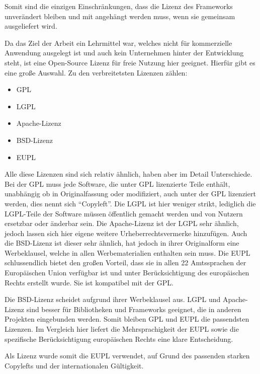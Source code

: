 Somit sind die einzigen Einschränkungen, dass die Lizenz des Frameworks unverändert bleiben und mit angehängt werden muss, wenn sie gemeinsam ausgeliefert wird.

Da das Ziel der Arbeit ein Lehrmittel war, welches nicht für kommerzielle Anwendung ausgelegt ist und auch kein Unternehmen hinter der Entwicklung steht, ist eine Open-Source Lizenz für freie Nutzung hier geeignet. Hierfür gibt es eine große Auswahl. Zu den verbreitetsten Lizenzen zählen:

\begin{itemize}
	\item \ac{GPL}
	\item \ac{LGPL}
	\item Apache-Lizenz
	\item \ac{BSD}-Lizenz
	\item \ac{EUPL}
\end{itemize}

Alle diese Lizenzen sind sich relativ ähnlich, haben aber im Detail Unterschiede.
Bei der \ac{GPL} muss jede Software, die unter GPL lizenzierte Teile enthält, unabhängig ob in Originalfassung oder modifiziert, auch unter der \ac{GPL} lizenziert werden, dies nennt sich "`Copyleft"'. \cite{gpl_wiki}
Die \ac{LGPL} ist hier weniger strikt, lediglich die \ac{LGPL}-Teile der Software müssen öffentlich gemacht werden und von Nutzern ersetzbar oder änderbar sein. \cite{lgpl_wiki}
Die Apache-Lizenz ist der \ac{LGPL} sehr ähnlich, jedoch lassen sich hier eigene weitere Urheberrechtsvermerke hinzufügen. \cite{apache_wiki}
Auch die \ac{BSD}-Lizenz ist dieser sehr ähnlich, hat jedoch in ihrer Originalform eine Werbeklausel, welche in allen Werbematerialien enthalten sein muss. \cite{bsd_wiki}
Die \ac{EUPL} schlussendlich bietet den großen Vorteil, dass sie in allen 22 Amtssprachen der Europäischen Union verfügbar ist und unter Berücksichtigung des europäischen Rechts erstellt wurde. Sie ist kompatibel mit der \ac{GPL}. \cite{eupl_wiki}

Die \ac{BSD}-Lizenz scheidet aufgrund ihrer Werbeklausel aus. \ac{LGPL} und Apache-Lizenz sind besser für Bibliotheken und Frameworks geeignet, die in anderen Projekten eingebunden werden. Somit bleiben \ac{GPL} und \ac{EUPL} die passendsten Lizenzen. Im Vergleich hier liefert die Mehrsprachigkeit der \ac{EUPL} sowie die spezifische Berücksichtigung europäischen Rechts eine klare Entscheidung.

Als Lizenz wurde somit die \ac{EUPL} verwendet, auf Grund des passenden starken Copylefts und der internationalen Gültigkeit.